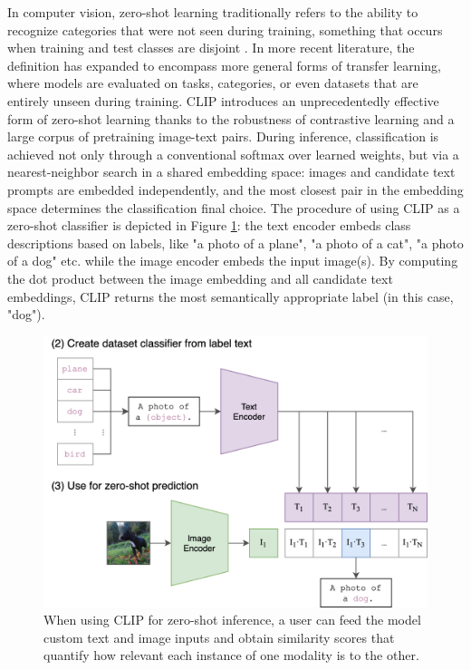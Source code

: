 \documentclass[a4paper, oneside, english]{sapthesis} %
\begin{document}
In computer vision, zero-shot learning traditionally refers to the ability to recognize categories that were not seen during training, something that occurs when training and test classes are disjoint \cite{lampert2009learning}. In more recent literature, the definition has expanded to encompass more general forms of transfer learning, where models are evaluated on tasks, categories, or even datasets that are entirely unseen during training.
CLIP introduces an unprecedentedly effective form of zero-shot learning thanks to the robustness of contrastive learning and a large corpus of pretraining image-text pairs. During inference, classification is achieved not only through a conventional softmax over learned weights, but via a nearest-neighbor search in a shared embedding space: images and candidate text prompts are embedded independently, and the most closest pair in the embedding space determines the classification final choice. The procedure of using CLIP as a zero-shot classifier is depicted in Figure \ref{fig:clipzs1}: the text encoder embeds class descriptions based on labels, like
"a photo of a plane", "a photo of a cat", "a photo of a dog" etc. while the image encoder embeds the input image(s). By computing the dot product between the image embedding and all candidate text embeddings, CLIP returns the most semantically appropriate label (in this case, "dog"). 

\begin{figure}[h]
    \centering
    \includegraphics[width=\textwidth]{img/CLIP-zero-shot.png}
    \caption{When using CLIP for zero-shot inference, a user can feed the model custom text and image inputs and obtain similarity scores that quantify how relevant each instance of one modality is to the other.}
    \label{fig:clipzs1}
\end{figure}
\end{document}
